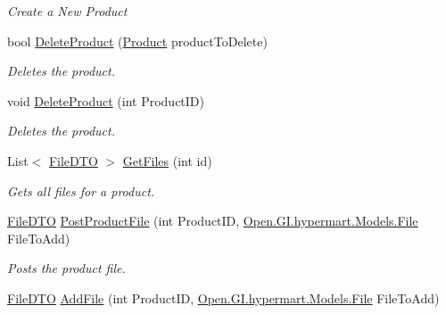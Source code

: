 \begin{DoxyCompactItemize}
\begin{DoxyCompactList}\small\item\em Create a New Product \end{DoxyCompactList}\item 
bool \hyperlink{class_open_1_1_g_i_1_1hypermart_1_1_controllers_1_1_store_content_controller_a3e98139b9c8d95c6afb1bbe699aff201}{Delete\+Product} (\hyperlink{class_open_1_1_g_i_1_1hypermart_1_1_models_1_1_product}{Product} product\+To\+Delete)
\begin{DoxyCompactList}\small\item\em Deletes the product. \end{DoxyCompactList}\item 
void \hyperlink{class_open_1_1_g_i_1_1hypermart_1_1_controllers_1_1_store_content_controller_aee0d4040607c0d07828fc0d000135fcd}{Delete\+Product} (int Product\+ID)
\begin{DoxyCompactList}\small\item\em Deletes the product. \end{DoxyCompactList}\item 
List$<$ \hyperlink{class_open_1_1_g_i_1_1hypermart_1_1_data_transformation_objects_1_1_file_d_t_o}{File\+D\+TO} $>$ \hyperlink{class_open_1_1_g_i_1_1hypermart_1_1_controllers_1_1_store_content_controller_ae0b56b375fd34ca44fd3d7c32be04c04}{Get\+Files} (int id)
\begin{DoxyCompactList}\small\item\em Gets all files for a product. \end{DoxyCompactList}\item 
\hyperlink{class_open_1_1_g_i_1_1hypermart_1_1_data_transformation_objects_1_1_file_d_t_o}{File\+D\+TO} \hyperlink{class_open_1_1_g_i_1_1hypermart_1_1_controllers_1_1_store_content_controller_aeab9cb977ea719d1baa4610b3bc6a631}{Post\+Product\+File} (int Product\+ID, \hyperlink{class_open_1_1_g_i_1_1hypermart_1_1_models_1_1_file}{Open.\+G\+I.\+hypermart.\+Models.\+File} File\+To\+Add)
\begin{DoxyCompactList}\small\item\em Posts the product file. \end{DoxyCompactList}\item 
\hyperlink{class_open_1_1_g_i_1_1hypermart_1_1_data_transformation_objects_1_1_file_d_t_o}{File\+D\+TO} \hyperlink{class_open_1_1_g_i_1_1hypermart_1_1_controllers_1_1_store_content_controller_a36a438b2ab2cbb1d937b6a4c5bd8b17d}{Add\+File} (int Product\+ID, \hyperlink{class_open_1_1_g_i_1_1hypermart_1_1_models_1_1_file}{Open.\+G\+I.\+hypermart.\+Models.\+File} File\+To\+Add)

\end{DoxyCompactItemize}
